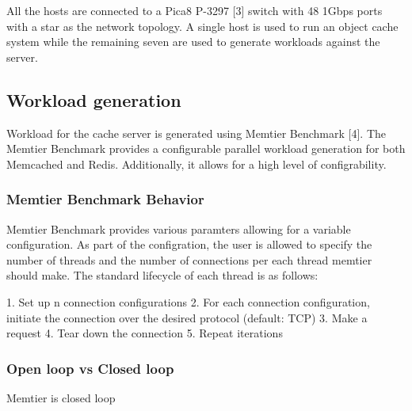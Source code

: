 All the hosts are connected to a Pica8 P-3297 [3] switch with 48 1Gbps ports with a star as the network topology. A single host is used to run an object cache system while the remaining seven are used to generate workloads against the server.

\subsection{Workload generation}
Workload for the cache server is generated using Memtier Benchmark [4]. The Memtier Benchmark provides a configurable parallel workload generation for both Memcached and Redis. Additionally, it allows for a high level of configrability.

\subsubsection{Memtier Benchmark Behavior}
Memtier Benchmark provides various paramters allowing for a variable configuration. As part of the configration, the user is allowed to specify the number of threads and the number of connections per each thread memtier should make. The standard lifecycle of each thread is as follows:

1. Set up n connection configurations
2. For each connection configuration, initiate the connection over the desired protocol (default: TCP)
3. Make a request
4. Tear down the connection
5. Repeat iterations

\subsubsection{Open loop vs Closed loop}
Memtier is closed loop




